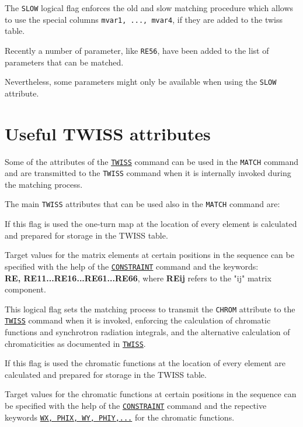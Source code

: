 The \texttt{SLOW} logical flag enforces the old and slow matching procedure
which allows to use the special columns \texttt{mvar1, ..., mvar4}, if they
are added to the twiss table.

Recently a number of parameter, like \texttt{RE56}, have been added to the
list of parameters that can be matched. 

Nevertheless, some parameters might only be available when using the
\texttt{SLOW} attribute.
 
\section{Useful TWISS attributes}

Some of the attributes of the \hyperref[chap:twiss]{\texttt{TWISS}} command
can be used in the \texttt{MATCH} command and are transmitted to the
\texttt{TWISS} command when it is internally invoked during the matching process. 

The main \texttt{TWISS} attributes that can be used also in the \texttt{MATCH}
command are:

\begin{madlist}
   If this flag is used the one-turn map at the location of every
  element is calculated and prepared for storage in the TWISS table.
 
  Target values for the matrix elements at certain positions in the
  sequence can be specified with the help of the
  \hyperref[sec:constraint]{\texttt{CONSTRAINT}} command and the keywords:\\
  \textbf{RE, RE11...RE16...RE61...RE66}, where \textbf{REij} refers to
  the "ij" matrix component.
  

   This logical flag sets the matching process to transmit
  the \texttt{CHROM} attribute to the \hyperref[chap:twiss]{\texttt{TWISS}}
  command when it is invoked, enforcing the calculation of chromatic
  functions and synchrotron radiation integrals, and the alternative
  calculation of chromaticities as documented in
  \hyperref[chap:twiss]{\texttt{TWISS}}.

  If this flag is used the chromatic functions at the location of
  every element are calculated and prepared for storage in the TWISS
  table. 
  
  Target values for the chromatic functions at certain positions in the
  sequence can be specified with the help of the
  \hyperref[sec:constraint]{\texttt{CONSTRAINT}} command and the
  repective keywords 
  \hyperref[subsec:tables-chrom]{\texttt{WX, PHIX, WY, PHIY,...}} for
  the chromatic functions. 
\end{madlist}


